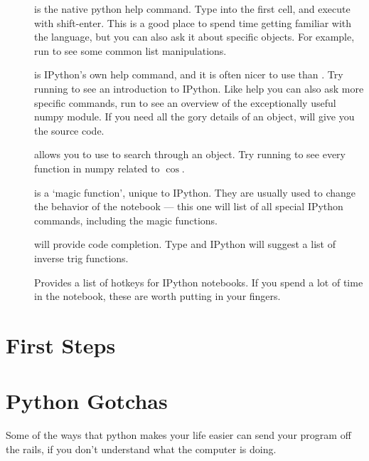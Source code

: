 \documentclass[justified, nobib]{tufte-handout}
\begin{document}
\begin{description}
\item[] is the native python help command.
Type  into the first cell, and execute with shift-enter.
This is a good place to spend time getting familiar with the language, but you can also ask it about specific objects.
For example, run  to see some common list manipulations.

\item[] is IPython's own help command, and it is often nicer to use than .
Try running  to see an introduction to IPython.
Like help you can also ask more specific commands, run  to see an overview of the exceptionally useful numpy module.
If you need all the gory details of an object,  will give you the source code.

\item[] allows you to use  to search through an object.
Try running  to see every function in numpy related to $\cos$.

\item[] is a `magic function', unique to IPython. They are usually used to change the behavior of the notebook --- this one will list of all special IPython commands, including the magic functions.

\item[] will provide code completion.
Type  and IPython will suggest a list of inverse trig functions.

\item[] Provides a list of hotkeys for IPython notebooks.
If you spend a lot of time in the notebook, these are worth putting in your fingers.

\end{description}


\pagebreak
\section*{First Steps}


\pagebreak

\section*{Python Gotchas}
Some of the ways that python makes your life easier can send your program off
the rails, if you don't understand what the computer is doing.
\end{document}
